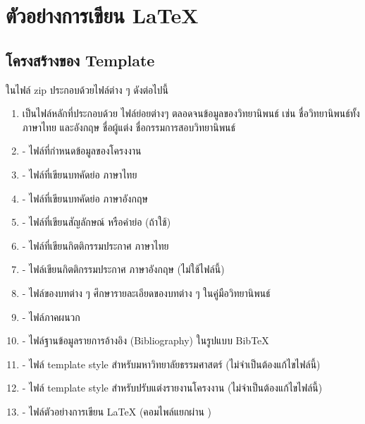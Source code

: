 \chapter{ตัวอย่างการเขียน LaTeX}
\label{example}

\section{โครงสร้างของ Template}
ในไฟล์ zip ประกอบด้วยไฟล์ต่าง ๆ ดังต่อไปนี้
\begin{enumerate}[1.]
    \item {} เป็นไฟล์หลักที่ประกอบด้วย ไฟล์ย่อยต่างๆ ตลอดจนข้อมูลของวิทยานิพนธ์ เช่น ชื่อวิทยานิพนธ์ทั้งภาษาไทย และอังกฤษ ชื่อผู้แต่ง ชื่อกรรมการสอบวิทยานิพนธ์
    \item {} - ไฟล์ที่กำหนดข้อมูลของโครงงาน
    \item {} - ไฟล์ที่เขียนบทคัดย่อ ภาษาไทย
    \item {} - ไฟล์ที่เขียนบทคัดย่อ ภาษาอังกฤษ
    \item {} - ไฟล์ที่เขียนสัญลักษณ์ หรือคำย่อ (ถ้าใช้)
    \item {} - ไฟล์ที่เขียนกิตติกรรมประกาศ ภาษาไทย
    \item {} - ไฟล์เขียนกิตติกรรมประกาศ ภาษาอังกฤษ (ไม่ใช้ไฟล์นี้)
    \item {} - ไฟล์ของบทต่าง ๆ ศึกษารายละเอียดของบทต่าง ๆ ในคู่มือวิทยานิพนธ์~\cite{tu:2556fk}
    \item {} - ไฟล์ภาคผนวก %
    \item {} - ไฟล์ฐานข้อมูลรายการอ้างอิง (Bibliography) ในรูปแบบ BibTeX
    \item {} - ไฟล์ template style สำหรับมหาวิทยาลัยธรรมศาสตร์ (ไม่จำเป็นต้องแก้ไขไฟล์นี้)
    \item {} - ไฟล์ template style สำหรับปรับแต่งรายงานโครงงาน (ไม่จำเป็นต้องแก้ไขไฟล์นี้)
    \item {} - ไฟล์ตัวอย่างการเขียน LaTeX (คอมไพล์แยกผ่าน )
\end{enumerate}

\newpage
